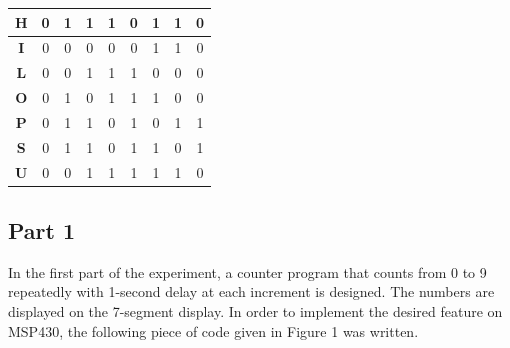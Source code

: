 \documentclass[pdftex,12pt,a4paper]{article}
\begin{document}
\begin{table}[H]
\begin{tabular}{|c|c|c|c|c|c|c|c|c|}
\textbf{H}     & 0          & 1          & 1          & 1          & 0          & 1          & 1          & 0          \\ \hline
\textbf{I}     & 0          & 0          & 0          & 0          & 0          & 1          & 1          & 0          \\ \hline
\textbf{L}     & 0          & 0          & 1          & 1          & 1          & 0          & 0          & 0          \\ \hline
\textbf{O}     & 0          & 1          & 0          & 1          & 1          & 1          & 0          & 0          \\ \hline
\textbf{P}     & 0          & 1          & 1          & 0          & 1          & 0          & 1          & 1          \\ \hline
\textbf{S}     & 0          & 1          & 1          & 0          & 1          & 1          & 0          & 1          \\ \hline
\textbf{U}     & 0          & 0          & 1          & 1          & 1          & 1          & 1          & 0          \\ \hline
\end{tabular}
\end{table}

\subsection{Part 1}
In the first part of the experiment, a counter program that counts from 0 to 9 repeatedly with 1-second delay at each increment is designed. The numbers are displayed on the 7-segment display.
\newline
In order to implement the desired feature on MSP430, the following piece of
code given in Figure 1 was written.
\end{document}
